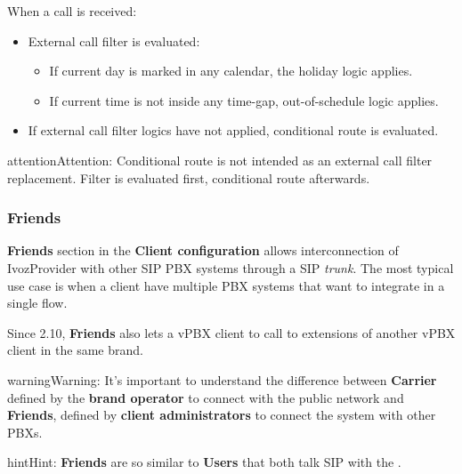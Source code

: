 \documentclass[letterpaper,10pt,english]{sphinxmanual}
\begin{document}
When a call is received:
\begin{itemize}
\item {} 
External call filter is evaluated:
\begin{itemize}
\item {} 
If current day is marked in any calendar, the holiday logic applies.

\item {} 
If current time is not inside any time-gap, out-of-schedule logic applies.

\end{itemize}

\item {} 
If external call filter logics have not applied, conditional route is evaluated.

\end{itemize}

\begin{notice}{attention}{Attention:}
Conditional route is not intended as an external call filter
replacement. Filter is evaluated first, conditional route afterwards.
\end{notice}


\subsubsection{Friends}
\label{administration_portal/client/vpbx/routing_endpoints/friends/index:friends}\label{administration_portal/client/vpbx/routing_endpoints/friends/index::doc}
\textbf{Friends} section in the \textbf{Client configuration} allows interconnection of
IvozProvider with other SIP PBX systems through a SIP \emph{trunk}. The most typical
use case is when a client have multiple PBX systems that want to integrate in
a single flow.

Since 2.10, \textbf{Friends} also lets a vPBX client to call to extensions of another
vPBX client in the same brand.

\begin{notice}{warning}{Warning:}
It's important to understand the difference between \textbf{Carrier}
defined by the \textbf{brand operator} to connect with the public network
and \textbf{Friends}, defined by \textbf{client administrators} to connect the
system with other PBXs.
\end{notice}

\begin{notice}{hint}{Hint:}
\textbf{Friends} are so similar to \textbf{Users} that both talk SIP with the
{\hyperref[administration_portal/platform/infrastructure/proxy_users:proxyusers]{}}.
\end{notice}
\end{document}
